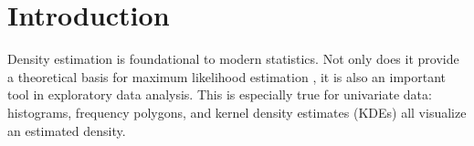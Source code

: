 
\makeatletter
\def\maxwidth{ %
  \ifdim\Gin@nat@width>\linewidth
    \linewidth
  \else
    \Gin@nat@width
  \fi
}
\makeatother

\makeatletter
\newenvironment{kframe}{%
 \def\at@end@of@kframe{}%
 \ifinner\ifhmode%
  \def\at@end@of@kframe{\end{minipage}}%
  \begin{minipage}{\columnwidth}%
 \fi\fi%
 \def\FrameCommand##1{\hskip\@totalleftmargin \hskip-\fboxsep
 \colorbox{shadecolor}{##1}\hskip-\fboxsep
     \hskip-\linewidth \hskip-\@totalleftmargin \hskip\columnwidth}%
 \MakeFramed {\advance\hsize-\width
   \@totalleftmargin\z@ \linewidth\hsize
   \@setminipage}}%
 {\par\unskip\endMakeFramed%
 \at@end@of@kframe}
\makeatother

\newenvironment{knitrout}{}{} %



\renewcommand{\P}[1]{\mathrm{P} \left( #1 \right)}
\newcommand{\Ps}[1]{\mathrm{P} \left( #1 \right)}
\newcommand{\Pwrt}[2]{\mathrm{P}_{#1} \left( #2 \right)}
\newcommand{\Pswrt}[2]{\mathrm{P}_{#1} \left( #2 \right)}

\newcommand{\pl}[1]{{\fontfamily{\sfdefault}\selectfont #1}}
\newtheorem{definition}{Definition}

\newcommand{\PRRV}[1]{P\left[#1\right]}
\newcommand{\PRRVwrt}[2]{P_{#1}\left[#2\right]}
\newcommand{\ve}[1]{\textbf{#1}}
\newcommand{\mc}[1]{\mathcal{#1}}
\newcommand{\al}{\alpha}
\renewcommand{\th}{\theta}
\renewcommand{\R}{\mathbb{R}}


\section{Introduction}\label{sec:introduction}

Density estimation is foundational to modern statistics.
Not only does it provide a theoretical basis for maximum likelihood estimation \citep{scott_multivariate_1992},
it is also an important tool in exploratory data analysis.
This is especially true for univariate data: histograms, frequency polygons, and kernel density estimates (KDEs) all visualize an estimated density.

